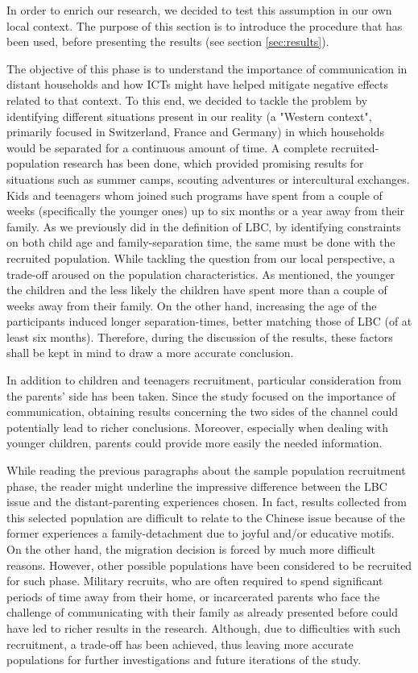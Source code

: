 In order to enrich our research, we decided to test this assumption in our own local context. The purpose of this section is to introduce the procedure that has been used, before presenting the results (see section \ref{sec:results}).

The objective of this phase is to understand the importance of communication in distant households and how ICTs might have helped mitigate negative effects related to that context. To this end, we decided to tackle the problem by identifying different situations present in our reality (a "Western context", primarily focused in Switzerland, France and Germany) in which households would be separated for a continuous amount of time. A complete recruited-population research has been done, which provided promising results for situations such as summer camps, scouting adventures or intercultural exchanges. Kids and teenagers whom joined such programs have spent from a couple of weeks (specifically the younger ones) up to six months or a year away from their family. As we previously did in the definition of LBC, by identifying constraints on both child age and family-separation time, the same must be done with the recruited population. While tackling the question from our local perspective, a trade-off aroused on the population characteristics. As mentioned, the younger the children and the less likely the children have spent more than a couple of weeks away from their family. On the other hand, increasing the age of the participants induced longer separation-times, better matching those of LBC (of at least six months). Therefore, during the discussion of the results, these factors shall be kept in mind to draw a more accurate conclusion.

In addition to children and teenagers recruitment, particular consideration from the parents' side has been taken. Since the study focused on the importance of communication, obtaining results concerning the two sides of the channel could potentially lead to richer conclusions. Moreover, especially when dealing with younger children, parents could provide more easily the needed information. 

While reading the previous paragraphs about the sample population recruitment phase, the reader might underline the impressive difference between the LBC issue and the distant-parenting experiences chosen. In fact, results collected from this selected population are difficult to relate to the Chinese issue because of the former experiences a family-detachment due to joyful and/or educative motifs. On the other hand, the migration decision is forced by much more difficult reasons. However, other possible populations have been considered to be recruited for such phase. Military recruits, who are often required to spend significant periods of time away from their home, or incarcerated parents who face the challenge of communicating with their family as already presented before could have led to richer results in the research. Although, due to difficulties with such recruitment, a trade-off has been achieved, thus leaving more accurate populations for further investigations and future iterations of the study.

